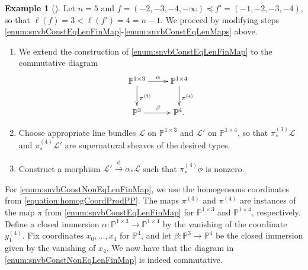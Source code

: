 \documentclass[12pt]{amsart}
\makeatletter
\def\theenumi{\@roman\c@enumi}
\theoremstyle{definition}
\newtheorem{eg}[equation]{Example}
\newenvironment{example}[1][]{\begin{eg}[#1] \pushQED{\qed}}{\popQED \end{eg}}
\newcommand{\PP}{\mathbb{P}}
\makeatother
\begin{document}
\begin{example}
\label{ex:root:diff:lengths}
Let $n=5$ and $f=(-2,-3,-4,-\infty) \preceq f'=(-1,-2,-3,-4)$, 
so that $\ell(f)=3 < \ell(f') = 4 = n-1$. 
We proceed by modifying steps 
\eqref{enum:snvbConstEqLenFinMap}-\eqref{enum:snvbConstEqLenMaps} 
above. 
{
\makeatletter
\def\theenumi{\@roman\c@enumi$'$}
\makeatother
\begin{enumerate}
\item\label{enum:snvbConstNonEqLenFinMap}
We extend the construction of \eqref{enum:snvbConstEqLenFinMap} 
to the commutative diagram
\[
\xymatrix{
\PP^{1\times 3} \ar[r]^{\alpha} \ar[d]^{\pi^{(3)}} & \PP^{1 \times 4} \ar[d]^{\pi^{(4)}}\\
\PP^3 \ar[r]^{\beta}&\PP^{4}.
}
\]
%
\item\label{enum:snvbConstNonEqLenPushFwd} 
Choose appropriate line bundles $\mathcal L$ on $\PP^{1\times 3}$ 
and $\mathcal L'$ on $\PP^{1\times 4}$, 
so that $\pi^{(3)}_* \mathcal L$ and $\pi^{(4)}_* \mathcal L'$ 
are supernatural sheaves of the desired types.
%
\item\label{enum:snvbConstNonEqLenMaps}
	Construct a morphism 
	$\mathcal L' \stackrel{\phi}{\longrightarrow}\alpha_*\mathcal L$ 
	such that $\pi^{(4)}_* \phi$ is nonzero. 
\end{enumerate}
}

For \eqref{enum:snvbConstNonEqLenFinMap}, we use the 
homogeneous coordinates from \eqref{equation:homogCoordProdPP}.
The maps $\pi^{(3)}$ and $\pi^{(4)}$ are instances of the map $\pi$ 
from \eqref{enum:snvbConstEqLenFinMap} for $\PP^{1 \times 3}$ 
and $\PP^{1 \times 4}$, respectively.
Define a closed immersion 
$\alpha\colon\PP^{1\times 3}\rightarrow \PP^{1\times 4}$ 
by the vanishing of the coordinate $y_1^{(4)}$. 
Fix coordinates $x_0, \ldots, x_4$ for $\PP^4$, and let 
$\beta\colon \PP^3 \rightarrow \PP^4$ be the closed immersion given 
by the vanishing of $x_4$. 
We now have that the diagram in 
\eqref{enum:snvbConstNonEqLenFinMap} is indeed commutative.


\end{example}
\end{document}

